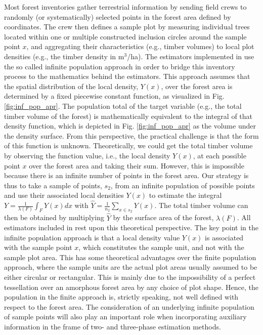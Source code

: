 Most forest inventories gather terrestrial information by sending field crews to randomly (or systematically) selected points in the forest area defined by coordinates. The crew then defines a sample plot by measuring individual trees located within one or multiple constructed inclusion circles around the sample point $x$, and aggregating their characteristics (e.g., timber volumes) to local plot densities (e.g., the timber density in m$^3$/ha). The estimators implemented in  use the so called infinite population approach in order to bridge this inventory process to the mathematics behind the estimators. This approach assumes that the spatial distribution of the local density, $Y(x)$, over the forest area is determined by a fixed piecewise constant function, as visualized in Fig. \ref{fig:inf_pop_apr}. The population total of the target variable (e.g., the total timber volume of the forest) is mathematically equivalent to the integral of that density function, which is depicted in Fig. \ref{fig:inf_pop_apr} as the volume under the density surface. From this perspective, the practical challenge is that the form of this function is unknown. Theoretically, we could get the total timber volume by observing the function value, i.e., the local density $Y(x)$, at each possible point $x$ over the forest area and taking their sum. However, this is impossible because there is an infinite number of points in the forest area. Our strategy is thus to take a sample of points, $s_2$, from an infinite population of possible points and use their associated local densities $Y(x)$ to estimate the integral $Y=\frac{1}{\lambda(F)}\int_{F}Y(x)dx$ with $\hat{Y}=\frac{1}{n_2}\sum_{x \in s_2}Y(x)$.  The total timber volume can then be obtained by multiplying $\hat{Y}$ by the surface area of the forest, $\lambda(F)$.  All estimators included in  rest upon this theoretical perspective. The key point in the infinite population approach is that a local density value $Y(x)$ is associated with the sample point $x$, which constitutes the sample unit, and not with the sample plot area. This has some theoretical advantages over the finite population approach, where the sample units are the actual plot areas usually assumed to be either circular or rectangular.  This is mainly due to the impossibility of a perfect tessellation over an amorphous forest area by any choice of plot shape. Hence, the population in the finite approach is, strictly speaking, not well defined with respect to the forest area. The consideration of an underlying infinite population of sample points will also play an important role when incorporating auxiliary information in the frame of two- and three-phase estimation methods.

